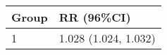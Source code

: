 \begin{tabular}{ll}
  \hline
Group & RR (96\%CI) \\ 
  \hline
   1 & 1.028 (1.024, 1.032) \\ 
   \hline
\end{tabular}

